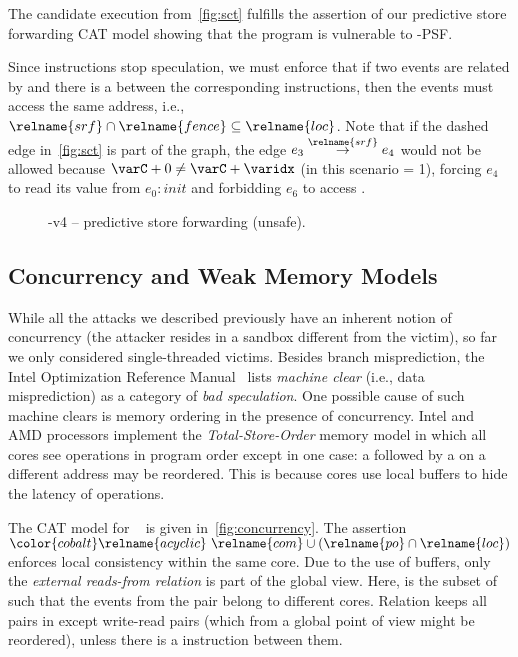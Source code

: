 \documentclass[conference]{IEEEtran}
\begin{document}
The candidate execution from~\autoref{fig:sct} fulfills the assertion of our predictive store forwarding CAT model showing that the program is vulnerable to \spectre-\textsc{PSF}.


Since \fence instructions stop speculation, we must enforce that if two events are related by  and there is a \fence between the corresponding instructions, then the events must access the same address, i.e., ${\relname{srf} \cap \relname{fence}} \subseteq {\relname{loc}}$.
Note that if the dashed  edge in~\autoref{fig:sct} is part of the graph, the edge $e_3 \stackrel{\relname{\scriptsize srf}}{\rightarrow} e_4$ would not be allowed because $\varC + 0 \not = \varC + \varidx$ (in this scenario \varidx = 1), forcing $e_4$ to read its value from $e_0: \mathit{init}$ and forbidding $e_6$ to access \secret.

\begin{figure}[t]
\centering
\scalebox{.8}{}
\caption{\spectre-v4 -- predictive store forwarding (unsafe).}
\label{fig:sct}
\end{figure}

\subsection{Concurrency and Weak Memory Models}
\label{sec:concurrency}

While all the attacks we described previously have an inherent notion of concurrency (the attacker resides in a sandbox different from the victim), so far we only considered single-threaded victims.
Besides branch misprediction, the Intel Optimization Reference Manual~\cite{intel-opt} lists \emph{machine clear} (i.e., data misprediction) as a category of \emph{bad speculation}.
One possible cause of such machine clears is memory ordering in the presence of concurrency.
Intel and AMD processors implement the \emph{Total-Store-Order} memory model in which all cores see operations in program order except in one case: a \store followed by a \load on a different address may be reordered. 
This is because cores use local buffers to hide the latency of \store operations.

The CAT model for \tso~\cite{SarkarSNORBMA09} is given in~\autoref{fig:concurrency}.
The assertion ${\color{cobalt}\relname{acyclic}}\,\,\relname{com}  \cup {(\relname{po} \cap \relname{loc})}$ enforces local consistency within the same core.
Due to the use of buffers, only the \emph{external reads-from relation} is part of the global view.
Here,  is the subset of  such that the events from the pair belong to different cores.
Relation  keeps all pairs in  except write-read pairs (which from a global point of view might be reordered), unless there is a \fence instruction between them.
\end{document}
